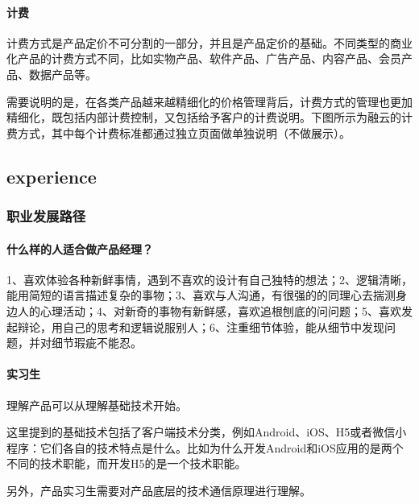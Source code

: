 \documentclass[letterpaper,11pt,english]{sphinxmanual}
\begin{document}
\paragraph{计费}
\label{\detokenize{chapter_skill/price:id2}}
计费方式是产品定价不可分割的一部分，并且是产品定价的基础。不同类型的商业化产品的计费方式不同，比如实物产品、软件产品、广告产品、内容产品、会员产品、数据产品等。

需要说明的是，在各类产品越来越精细化的价格管理背后，计费方式的管理也更加精细化，既包括内部计费控制，又包括给予客户的计费说明。下图所示为融云的计费方式，其中每个计费标准都通过独立页面做单独说明（不做展示）。


\subsection{experience}
\label{\detokenize{chapter_experience/index:experience}}\label{\detokenize{chapter_experience/index:chap-exper}}\label{\detokenize{chapter_experience/index::doc}}

\subsubsection{职业发展路径}
\label{\detokenize{chapter_experience/career_path:id1}}\label{\detokenize{chapter_experience/career_path::doc}}


\paragraph{什么样的人适合做产品经理？}
\label{\detokenize{chapter_experience/career_path:id2}}
1、喜欢体验各种新鲜事情，遇到不喜欢的设计有自己独特的想法；2、逻辑清晰，能用简短的语言描述复杂的事物；3、喜欢与人沟通，有很强的的同理心去揣测身边人的心理活动；4、对新奇的事物有新鲜感，喜欢追根刨底的问问题；5、喜欢发起辩论，用自己的思考和逻辑说服别人；6、注重细节体验，能从细节中发现问题，并对细节瑕疵不能忍。


\paragraph{实习生}
\label{\detokenize{chapter_experience/career_path:id3}}
理解产品可以从理解基础技术开始。

这里提到的基础技术包括了客户端技术分类，例如Android、iOS、H5或者微信小程序：它们各自的技术特点是什么。比如为什么开发Android和iOS应用的是两个不同的技术职能，而开发H5的是一个技术职能。

另外，产品实习生需要对产品底层的技术通信原理进行理解。
\end{document}
